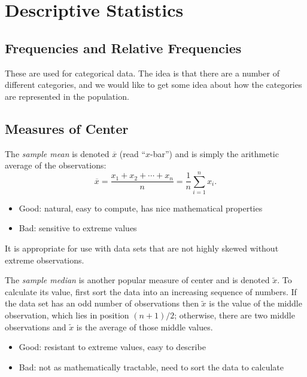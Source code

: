 \documentclass[captions=tableheading]{scrbook}
\begin{document}
\section{Descriptive Statistics}
\label{sec-2-3}
\label{sec:Descriptive-Statistics}
\subsection{Frequencies and Relative Frequencies}
\label{sec-2-3-1}
\label{sub:Frequencies-and-Relative}


These are used for categorical data. The idea is that there are a number of different categories, and we would like to get some idea about how the categories are represented in the population. 
\subsection{Measures of Center}
\label{sec-2-3-2}
\label{sub:Measures-of-Center}


The \emph{sample mean} is denoted \(\overline{x}\) (read ``\(x\)-bar'') and is simply the arithmetic average of the observations:
\begin{equation} 
\overline{x}=\frac{x_{1}+x_{2}+\cdots+x_{n}}{n}=\frac{1}{n}\sum_{i=1}^{n}x_{i}.
\end{equation}
\begin{itemize}
\item Good: natural, easy to compute, has nice mathematical properties
\item Bad: sensitive to extreme values
\end{itemize}

It is appropriate for use with data sets that are not highly skewed without extreme observations.

The \emph{sample median} is another popular measure of center and is denoted \(\tilde{x}\). To calculate its value, first sort the data into an increasing sequence of numbers. If the data set has an odd number of observations then \(\tilde{x}\) is the value of the middle observation, which lies in position \((n+1)/2\); otherwise, there are two middle observations and \(\tilde{x}\) is the average of those middle values.

\begin{itemize}
\item Good: resistant to extreme values, easy to describe
\item Bad: not as mathematically tractable, need to sort the data to calculate
\end{itemize}
\end{document}
